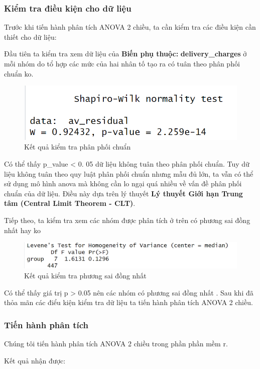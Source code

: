 \subsubsection{Kiểm tra điều kiện cho dữ liệu}
Trước khi tiến hành phân tích ANOVA 2 chiều, ta cần kiểm tra các điều kiện cần thiết cho dữ liệu:


 Đầu tiên ta kiểm tra xem dữ liệu của \textbf{Biến phụ thuộc:} \textbf{delivery\_charges} ở mỗi nhóm do tổ hợp các mức của hai nhân tố tạo ra có tuân theo phân phối chuẩn ko.
 \begin{figure}[!htbp]
    \centering
    \includegraphics[width=0.7\linewidth]{graphics/5.4.1 (2).png}
    \caption{Kết quả kiểm tra phân phối chuẩn}
\end{figure}

Có thể thấy p\_value < 0. 05 dữ liệu không tuân theo phân phối chuẩn.
Tuy dữ liệu không tuân theo quy luật phân phối chuẩn nhưng mẫu đủ lớn, ta vẫn có thể sử dụng mô hình anova mà không cần lo ngại quá nhiều về vấn đề phân phối chuẩn của dữ liệu. Điều này dựa trên lý thuyết \textbf{Lý thuyết Giới hạn Trung tâm (Central Limit Theorem - CLT)}. 


   Tiếp theo, ta kiểm tra xem các nhóm được phân tích ở trên có phương sai đồng nhất hay ko 

   \begin{figure}[!htbp]
    \centering
    \includegraphics[width=0.7\linewidth]{graphics/5.4.2.png}
    \caption{Kết quả kiểm tra phương sai đồng nhất}
\end{figure}

Có thể thấy giá trị p > 0.05 nên các nhóm có phương sai đồng nhất . 
Sau khi đã thỏa mãn các điểu kiện kiểm tra dữ liệu ta tiến hành phân tích ANOVA 2 chiều.

\subsubsection{Tiến hành phân tích}
Chúng tôi tiến hành phân tích ANOVA 2 chiều trong phần phần mềm r. 

         Kết quả nhận được: 
        
